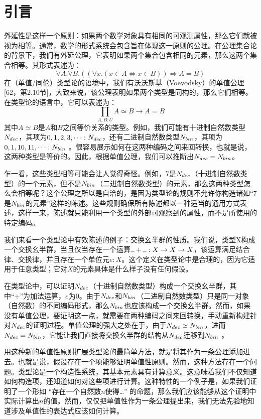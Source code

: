 \documentclass{ctexrep}
\title{}
\author{}
\date{}
\let\mathbb\relax %
\theoremstyle{plain}
\theoremstyle{definition}
\theoremstyle{remark}
\newcommand{\ul}{{\rule[0ex]{0.5em}{0.4pt}}} %
\begin{document}
\chapter{引言}
外延性是这样一个原则：如果两个数学对象具有相同的可观测属性，那么它们就被视为相等。通常，数学的形式系统会包含旨在体现这一原则的公理。在公理集合论的背景下，我们有外延公理，它表明如果两个集合包含相同的元素，那么这两个集合相等。其形式表述为：
\[\forall A . \forall B .((\forall x .(x \in A \Leftrightarrow x \in B)) \Rightarrow A=B)\] 
在（单值/同伦）类型论的语境中，我们有沃沃斯基（Voevodsky）的单值公理[62，第2.10节]，大致来说，该公理表明如果两个类型是同构的，那么它们相等。在类型论的语言中，它可以表述为：
\[\prod_{A, B: U} A \simeq B \to A=B\]
其中\(A \simeq B\)是\(A\)和\(B\)之间等价关系的类型。例如，我们可能有十进制自然数类型\(\mathbb{N}_{dec}\)，其项为\(0, 1, 2, 3, \cdots: \mathbb{N}_{dec}\)，还有二进制自然数类型\(\mathbb{N}_{bin}\)，其项为\(0, 1, 10, 11, \cdots: \mathbb{N}_{bin}\) 。很容易展示如何在这两种编码之间来回转换，也就是说，这两种类型是等价的。因此，根据单值公理，我们可以推断出\(\mathbb{N}_{dec} = \mathbb{N}_{bin}\)。 

乍一看，这些类型相等可能会让人觉得奇怪。例如，7是\(\mathbb{N}_{dec}\)（十进制自然数类型）的一个元素，但不是\(\mathbb{N}_{bin}\)（二进制自然数类型）的元素，那么这两种类型怎么会相等呢？这个公理之所以是自洽的，是因为类型论的规则不允许你构造诸如“7是\(\mathbb{N}_{bin}\)的元素”这样的陈述。这些规则确保所有陈述都以一种适当的通用方式表述，这样一来，陈述就只能利用一个类型的外部可观察到的属性，而不是所使用的特定编码。

我们来看一个类型论中有效陈述的例子：交换幺半群的性质。我们说，类型X构成一个交换幺半群，当且仅当存在一个运算\(\ul +\ul : X \to X \to X\)，该运算满足结合律、交换律，并且存在一个单位元\(e: X\)。这个定义在类型论中是合理的，因为它适用于任意类型；它对$X$的元素具体是什么样子没有任何假设。 

在类型论中，可以证明\(\mathbb{N}_{dec}\)（十进制自然数类型）构成一个交换幺半群，其中“+”为加法运算，\(e\)为\(0\)。由于\(\mathbb{N}_{dec}\)和\(\mathbb{N}_{bin}\)（二进制自然数类型）只是同一对象（自然数）的不同编码形式，那么\(\mathbb{N}_{bin}\)也应该构成一个交换幺半群。然而，如果没有单值公理，要证明这一点，就需要在两种编码之间来回转换，手动重新构建针对\(\mathbb{N}_{dec}\)的证明过程。单值公理的强大之处在于，由于\(\mathbb{N}_{dec} \simeq \mathbb{N}_{bin}\)，进而\(\mathbb{N}_{dec}=\mathbb{N}_{bin}\)，它能让我们直接将交换幺半群的结构从\(\mathbb{N}_{dec}\)迁移到\(\mathbb{N}_{bin}\) 。 

用这种新的单值性原则扩展类型论的最简单方法，就是将其作为一条公理添加进去。也就是说，假设存在一个项能够证明单值性原则。然而，这种方法存在一个问题。类型论是一个构造性系统，其基本元素具有计算意义。这意味着我们不仅知道如何构造项，还知道如何对这些项进行计算。这种特性的一个例子是，如果我们证明了一个形如 “存在一个自然数$n$使得\ldots” 的命题，那么我们应该能够从这个证明中实际计算出$n$的值。然而，仅仅把单值性作为一条公理提出来，我们无法先验地知道涉及单值性的表达式应该如何计算。 
\end{document}
